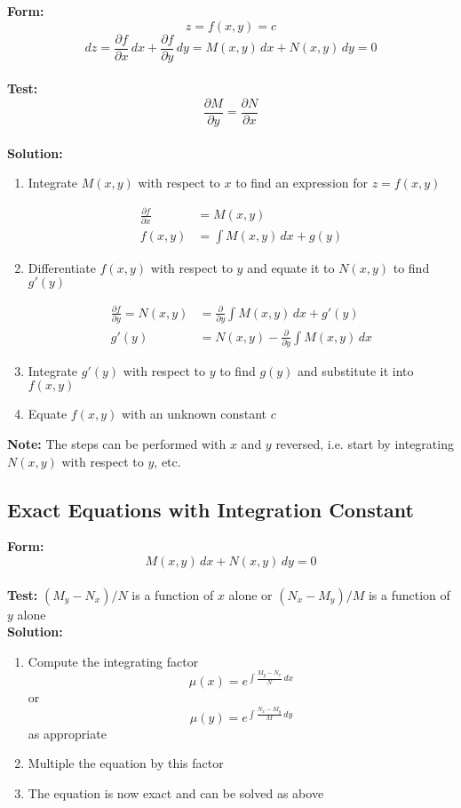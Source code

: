 \documentclass{article}
\begin{document}
\textbf{Form:} \[z = f(x, y) = c\] \[dz = \frac{\partial f}{\partial x} \,d x + \frac{\partial f}{\partial y} \,d y = M(x, y) \,d x + N(x, y) \,d y = 0\] \\ \textbf{Test:} \[\frac{\partial M}{\partial y} = \frac{\partial N}{\partial x}\] \\ \textbf{Solution:} \begin{enumerate}
  \item Integrate $M(x, y)$ with respect to $x$ to find an expression for $z = f(x, y)$

        \begin{align*}
          \frac{\partial f}{\partial x} & = M(x, y)                   \\
          f(x, y)                       & = \int M(x, y) \,d x + g(y)
        \end{align*}

  \item Differentiate $f(x, y)$ with respect to $y$ and equate it to $N(x, y)$ to find $g'(y)$

        \begin{align*}
          \frac{\partial f}{\partial y} = N(x, y) & = \frac{\partial}{\partial y} \int M(x, y) \,d x + g'(y)   \\
          g'(y)                                   & = N(x, y) - \frac{\partial}{\partial y} \int M(x, y) \,d x
        \end{align*}

  \item Integrate $g'(y)$ with respect to $y$ to find $g(y)$ and substitute it into $f(x, y)$

  \item Equate $f(x, y)$ with an unknown constant $c$
\end{enumerate} \textbf{Note:} The steps can be performed with $x$ and $y$ reversed, i.e. start by integrating $N(x, y)$ with respect to $y$, etc.

\subsection{Exact Equations with Integration Constant}

\textbf{Form:} \[M(x, y) \,d x + N(x, y) \,d y = 0\] \\ \textbf{Test:} $(M_y - N_x) / N$ is a function of $x$ alone or $(N_x - M_y) / M$ is a function of $y$ alone \\ \textbf{Solution:}

\begin{enumerate}
  \item Compute the integrating factor \[\mu(x) = e^{\int \frac{M_y - N_x}{N} \,d x}\] or \[\mu(y) = e^{\int \frac{N_x - M_y}{M} \,d y}\] as appropriate

  \item Multiple the equation by this factor

  \item The equation is now exact and can be solved as above
\end{enumerate}
\end{document}
